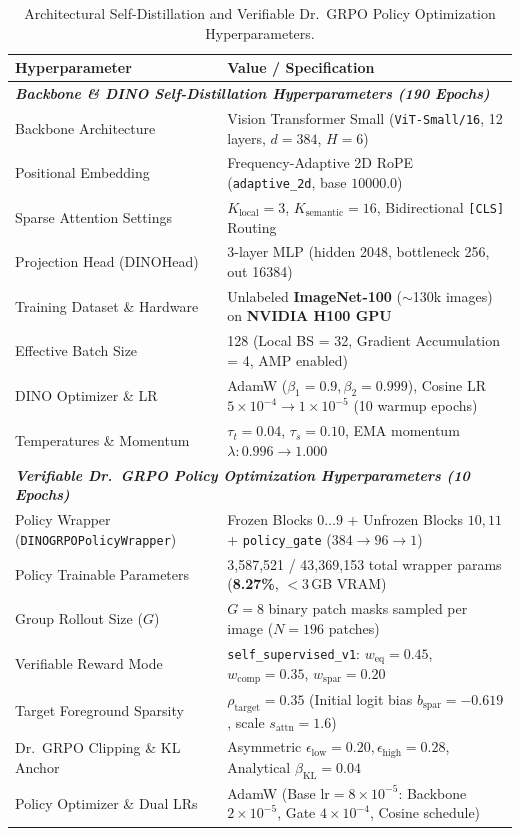 \documentclass[11pt,a4paper]{article}
\begin{document}
\begin{table}[ht]
\centering
\small
\caption{Architectural Self-Distillation and Verifiable Dr.\ GRPO Policy Optimization Hyperparameters.}
\label{tab:hyperparams}
\begin{tabularx}{\columnwidth}{lX}
\toprule
\textbf{Hyperparameter} & \textbf{Value / Specification} \\
\midrule
\multicolumn{2}{l}{\textit{\textbf{Backbone \& DINO Self-Distillation Hyperparameters (190 Epochs)}}} \\
Backbone Architecture & Vision Transformer Small (\texttt{ViT-Small/16}, 12 layers, $d=384$, $H=6$) \\
Positional Embedding & Frequency-Adaptive 2D RoPE (\texttt{adaptive\_2d}, base $10000.0$) \\
Sparse Attention Settings & $K_{\text{local}} = 3$, $K_{\text{semantic}} = 16$, Bidirectional \texttt{[CLS]} Routing \\
Projection Head (DINOHead) & 3-layer MLP (hidden 2048, bottleneck 256, out 16384) \\
Training Dataset \& Hardware & Unlabeled \textbf{ImageNet-100} ($\sim$130k images) on \textbf{NVIDIA H100 GPU} \\
Effective Batch Size & 128 (Local BS = 32, Gradient Accumulation = 4, AMP enabled) \\
DINO Optimizer \& LR & AdamW ($\beta_1 = 0.9, \beta_2 = 0.999$), Cosine LR $5\times 10^{-4} \to 1\times 10^{-5}$ (10 warmup epochs) \\
Temperatures \& Momentum & $\tau_t = 0.04$, $\tau_s = 0.10$, EMA momentum $\lambda: 0.996 \to 1.000$ \\
\midrule
\multicolumn{2}{l}{\textit{\textbf{Verifiable Dr.\ GRPO Policy Optimization Hyperparameters (10 Epochs)}}} \\
Policy Wrapper (\texttt{DINOGRPOPolicyWrapper}) & Frozen Blocks $0\dots 9$ + Unfrozen Blocks $10, 11$ + \texttt{policy\_gate} ($384\to 96\to 1$) \\
Policy Trainable Parameters & 3,587,521 / 43,369,153 total wrapper params (\textbf{8.27\%}, $<3$\,GB VRAM) \\
Group Rollout Size ($G$) & $G = 8$ binary patch masks sampled per image ($N=196$ patches) \\
Verifiable Reward Mode & \texttt{self\_supervised\_v1}: $w_{\text{eq}}=0.45$, $w_{\text{comp}}=0.35$, $w_{\text{spar}}=0.20$ \\
Target Foreground Sparsity & $\rho_{\text{target}} = 0.35$ (Initial logit bias $b_{\text{spar}} = -0.619$, scale $s_{\text{attn}} = 1.6$) \\
Dr.\ GRPO Clipping \& KL Anchor & Asymmetric $\epsilon_{\text{low}} = 0.20, \epsilon_{\text{high}} = 0.28$, Analytical $\beta_{\text{KL}} = 0.04$ \\
Policy Optimizer \& Dual LRs & AdamW (Base $\text{lr}=8\times 10^{-5}$: Backbone $2\times 10^{-5}$, Gate $4\times 10^{-4}$, Cosine schedule) \\
\bottomrule
\end{tabularx}
\end{table}
\end{document}
